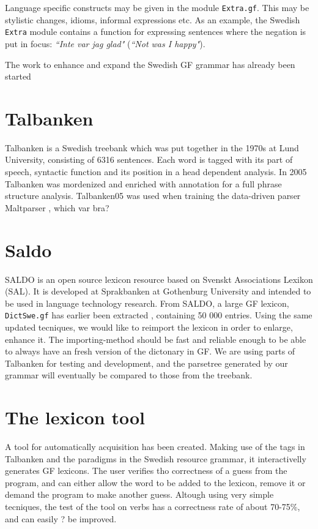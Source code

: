 \documentclass[submission,copyright,creativecommons]{eptcs} %
\begin{document}
Language specific constructs may be
given in the module \verb|Extra.gf|. This may be stylistic changes, idioms, informal
expressions etc.
As an example, the Swedish \verb|Extra| module contains a function for expressing sentences
where the negation is put in focus: \emph{``Inte var jag glad"} (\emph{``Not was I happy"}).


The work to enhance and expand the Swedish GF grammar has already been started


\section{Talbanken}
Talbanken\cite{talbanken} is
a Swedish treebank which was put together in the 1970s at Lund University,
consisting of 6316 sentences. Each word is tagged with 
its part of speech, syntactic function and its position in a head dependent
analysis.
In 2005 Talbanken was mordenized \cite{} and enriched with annotation for a
full phrase structure analysis. Talbanken05 was used when training the 
data-driven parser Maltparser \cite{}, which var bra?

\section{Saldo}

SALDO\cite{saldo} is an open source lexicon resource
based on Svenskt Associations Lexikon (SAL). It is
developed at Sprakbanken\cite{} at Gothenburg University
and intended to be used in language technology
research. 
From SALDO, a large GF lexicon, \\
\verb|DictSwe.gf| has earlier been extracted \cite{},
containing 50 000 entries. Using the same updated tecniques,
we would like to reimport the lexicon in order to enlarge,
enhance it. The importing-method should be fast and reliable
enough to be able to always have an fresh version of the dictonary
in GF.
We are using parts of Talbanken for testing and development,
and the parsetree generated by our grammar will eventually be 
compared to those from the treebank.


\section{The lexicon tool}
A tool for automatically acquisition has been created. Making use of the
tags in Talbanken and the paradigms in the Swedish resource grammar, 
it interactivelly generates GF lexicons. The user
verifies tho correctness of a guess from the program, and can either
allow the word to be added to the lexicon, remove it or demand the program
to make another guess.
Altough using very simple tecniques, the test of the tool on verbs 
has a correctness rate of about
70-75\%, and can easily ? be improved.
\end{document}

